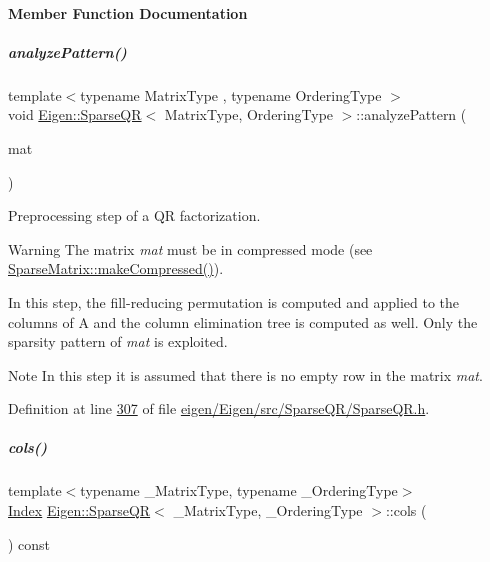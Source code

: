 \paragraph{Member Function Documentation}
\mbox{\label{group___sparse_q_r___module_a4b425ddb1358c914d764cde48853a4f6}} 
\subparagraph{\texorpdfstring{analyze\+Pattern()}{analyzePattern()}}
{\footnotesize\ttfamily template$<$typename Matrix\+Type , typename Ordering\+Type $>$ \\
void \hyperlink{group___sparse_q_r___module_class_eigen_1_1_sparse_q_r}{Eigen\+::\+Sparse\+QR}$<$ Matrix\+Type, Ordering\+Type $>$\+::analyze\+Pattern (\begin{DoxyParamCaption}\item[{const Matrix\+Type \&}]{mat }\end{DoxyParamCaption})}



Preprocessing step of a QR factorization. 

\begin{DoxyWarning}{Warning}
The matrix {\itshape mat} must be in compressed mode (see \hyperlink{group___sparse_core___module_a5ff54ffc10296f9466dc81fa888733fd}{Sparse\+Matrix\+::make\+Compressed()}).
\end{DoxyWarning}
In this step, the fill-\/reducing permutation is computed and applied to the columns of A and the column elimination tree is computed as well. Only the sparsity pattern of {\itshape mat} is exploited.

\begin{DoxyNote}{Note}
In this step it is assumed that there is no empty row in the matrix {\itshape mat}. 
\end{DoxyNote}


Definition at line \hyperlink{eigen_2_eigen_2src_2_sparse_q_r_2_sparse_q_r_8h_source_l00307}{307} of file \hyperlink{eigen_2_eigen_2src_2_sparse_q_r_2_sparse_q_r_8h_source}{eigen/\+Eigen/src/\+Sparse\+Q\+R/\+Sparse\+Q\+R.\+h}.

\mbox{\label{group___sparse_q_r___module_a57bedc9b1351c0995bae8ad0088a6fce}} 
\subparagraph{\texorpdfstring{cols()}{cols()}\hspace{0.1cm}{\footnotesize\ttfamily [1/2]}}
{\footnotesize\ttfamily template$<$typename \+\_\+\+Matrix\+Type, typename \+\_\+\+Ordering\+Type$>$ \\
\hyperlink{namespace_eigen_a62e77e0933482dafde8fe197d9a2cfde}{Index} \hyperlink{group___sparse_q_r___module_class_eigen_1_1_sparse_q_r}{Eigen\+::\+Sparse\+QR}$<$ \+\_\+\+Matrix\+Type, \+\_\+\+Ordering\+Type $>$\+::cols (\begin{DoxyParamCaption}\item[{void}]{ }\end{DoxyParamCaption}) const\hspace{0.3cm}{\ttfamily [inline]}}


